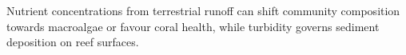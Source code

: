 
Nutrient concentrations from terrestrial runoff can shift community composition towards macroalgae or favour coral health, while turbidity governs sediment deposition on reef surfaces. %

